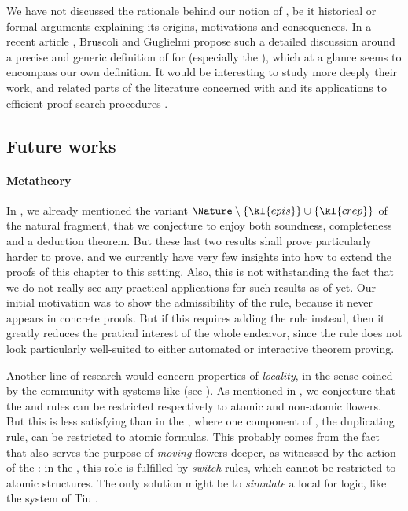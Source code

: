 \begin{scope}
We have not discussed the rationale behind our notion of , be it
historical or formal arguments explaining its origins, motivations and
consequences. In a recent article , Bruscoli
and Guglielmi propose such a detailed discussion around a precise and generic
definition of  for   (especially
the ), which at a glance seems to encompass our own
definition. It would be interesting to study more deeply their work, and related
parts of the  literature concerned with  and its
applications to efficient proof search procedures
.

\subsection{Future works}

\paragraph{Metatheory}

In , we already mentioned the variant $\Nature \setminus
\{\kl{epis}\} \cup \{\kl{crep}\}$ of the natural fragment, that we conjecture
to enjoy both soundness, completeness and a deduction theorem. But these last
two results shall prove particularly harder to prove, and we currently have very
few insights into how to extend the proofs of this chapter to this setting.
Also, this is not withstanding the fact that we do not really see any practical
applications for such results as of yet. Our initial motivation was to show the
admissibility of the  rule, because it never appears in concrete
proofs. But if this requires adding the  rule instead, then it greatly
reduces the pratical interest of the whole endeavor, since the  rule
does not look particularly well-suited to either automated or interactive
theorem proving.

Another line of research would concern properties of \emph{locality}, in the
sense coined by the  community with systems like  (see
). As mentioned in , we
conjecture that the  and  rules can be restricted
respectively to atomic and non-atomic flowers. But this is less satisfying than
in the , where one component of , the
duplicating \emph{} rule, can be restricted to atomic formulas. This
probably comes from the fact that  also serves the purpose of
\emph{moving} flowers deeper, as witnessed by the   action of
the : in the , this role is fulfilled by
\emph{switch} rules, which cannot be restricted to atomic structures. The only
solution might be to \emph{simulate} a local  for
 logic, like the system  of Tiu
.


\end{scope}
